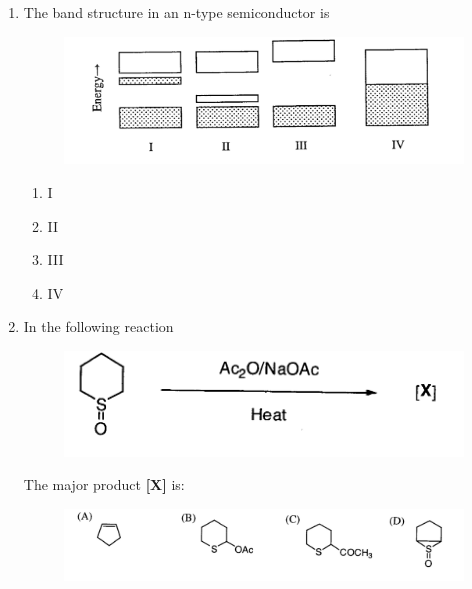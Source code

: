 \documentclass[journal,12pt,onecolumn]{IEEEtran}
\theoremstyle{remark}
\begin{document}
\begin{enumerate}
\item    The band structure in an n-type semiconductor is \hfill{}
 


\begin{figure}
    \centering
   \includegraphics[width=0.5\columnwidth]{figs/image1.png}
      \caption{}
    \label{fig:figure1}
\end{figure}
    


\begin{multicols}{2}
\begin{enumerate}
\item I  
\item II  
\item III  
\item IV  
\end{enumerate}
\end{multicols}
 



\item    In the following reaction \hfill{}
 

\begin{figure}
    \centering
    \includegraphics[width=0.5\columnwidth]{figs/image2.png}
    \caption{}
    \label{fig:figure2}
\end{figure}




\noindent The major product \textbf{[X]} is:
 
\begin{figure}
    \centering
    \includegraphics[width=0.5\columnwidth]{figs/image3.png}
    \caption{}
    \label{fig:figure3}
\end{figure}


 



\end{enumerate}
\end{document}
